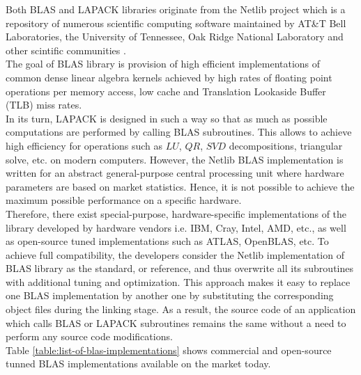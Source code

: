 Both BLAS and LAPACK libraries originate from the Netlib project which is a repository of numerous scientific computing software maintained by AT\&T Bell Laboratories, the University of Tennessee, Oak Ridge National Laboratory and other scintific communities \cite{netlib-overview}.\\


The goal of BLAS library is provision of high efficient implementations of common dense linear algebra kernels achieved by high rates of floating point operations per memory access, low cache and Translation Lookaside Buffer (TLB) miss rates.\\


In its turn, LAPACK is designed in such a way so that as much as possible computations are performed by calling BLAS subroutines. This allows to achieve high efficiency for operations such as $LU$, $QR$, $SVD$ decompositions, triangular solve, etc. on modern computers. However, the Netlib BLAS implementation is written for an abstract general-purpose central processing unit where hardware parameters are based on market statistics. Hence, it is not possible to achieve the maximum possible performance on a specific hardware.\\


Therefore, there exist special-purpose, hardware-specific implementations of the library developed by hardware vendors i.e. IBM, Cray, Intel, AMD, etc., as well as open-source tuned implementations such as ATLAS, OpenBLAS, etc. To achieve full compatibility, the developers consider the Netlib implementation of BLAS library as the standard, or reference, and thus overwrite all its subroutines with additional tuning and optimization. This approach makes it easy to replace one BLAS implementation by another one by substituting the corresponding object files during the linking stage. As a result, the source code of an application which calls BLAS or LAPACK subroutines remains the same without a need to perform any source code modifications.\\
 

Table \ref{table:list-of-blas-implementations} shows commercial and open-source tunned BLAS implementations available on the market today.\\

